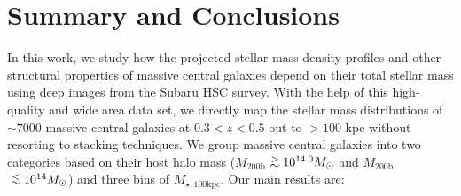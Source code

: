 \documentclass[a4paper,fleqn,usenatbib]{mnras}
\def\simlt{\lower.5ex\hbox{$\; \buildrel < \over {\sim} \;$}}
\def\simgt{\lower.5ex\hbox{$\; \buildrel > \over {\sim} \;$}}
\def\mhalo{{$M_{\mathrm{200b}}$}}
\def\mtot{{$M_{\star,100\mathrm{kpc}}$}}
\begin{document}
    


\section{Summary and Conclusions}
    \label{sec:summary}
    
    In this work, we study how the projected stellar mass density profiles and other 
    structural properties of massive central galaxies depend on their total stellar 
    mass using deep images from the Subaru HSC survey. 
    With the help of this high-quality and wide area data set, we directly map the 
    stellar mass distributions of ${\sim}7000$ massive central galaxies at 
    $0.3 < z < 0.5$ out to $>100$ kpc without resorting to stacking techniques. 
    We group massive central galaxies into two categories based on their host halo 
    mass (\mhalo{}$\simgt 10^{14.0} M_{\odot}$ and \mhalo{}$\simlt 10^{14} M_{\odot}$)
    and three bins of \mtot{}.  
    Our main results are:  
    
\end{document}
